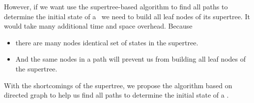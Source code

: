 However, if we want use the supertree-based algorithm to find all paths to determine the initial state of a \BCN\ we need to build all leaf nodes of its supertree. It would take many additional time and space overhead. Because 
\begin{itemize}
 \item there are many nodes identical set of states in the supertree.
 \item And the same nodes in a path will prevent us from building all leaf nodes of the supertree.
 \end{itemize}
 
With the shortcomings of the supertree, we propose the algorithm based on directed graph to help us find all paths to determine the initial state of a \BCN.
